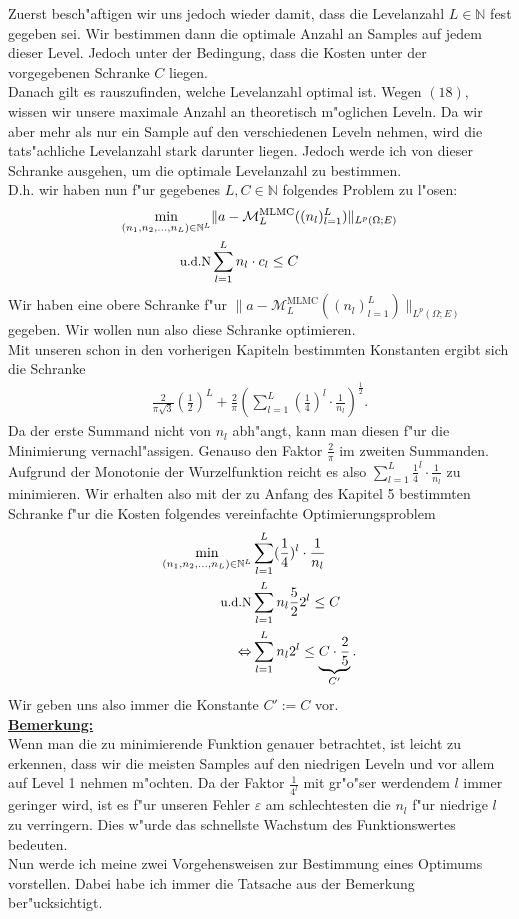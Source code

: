Zuerst besch"aftigen wir uns jedoch wieder damit, dass die Levelanzahl $L\in\mathbb{N}$ fest gegeben sei. Wir bestimmen dann die optimale Anzahl an Samples auf jedem dieser Level. Jedoch unter der Bedingung, dass die Kosten unter der vorgegebenen Schranke $C$ liegen.\\
Danach gilt es rauszufinden, welche Levelanzahl optimal ist. Wegen $(18)$, wissen wir unsere maximale Anzahl an theoretisch m"oglichen Leveln. Da wir aber mehr als nur ein Sample auf den verschiedenen Leveln nehmen, wird die tats"achliche Levelanzahl stark darunter liegen. Jedoch werde ich von dieser Schranke ausgehen, um die optimale Levelanzahl zu bestimmen.\\[0,1cm]
D.h. wir haben nun f"ur gegebenes $L,C \in \mathbb{N}$ folgendes Problem zu l"osen:
\begin{align*}
\min_{(n_1,n_2,...,n_L)\in\mathbb{N}^L}& \|a-\mathcal{M}_L^{\text{MLMC}}((n_l)_{l=1}^L)\|_{L^p(\Omega;E)}\\
\text{\small{u.d.N}}& \sum_{l=1}^L n_l \cdot c_l \leq C
\end{align*}
Wir haben eine obere Schranke f"ur $\|a-\mathcal{M}_L^{\text{MLMC}}((n_l)_{l=1}^L)\|_{L^p(\Omega;E)}$ gegeben. 
Wir wollen nun also diese Schranke optimieren.\\
 Mit unseren schon in den vorherigen Kapiteln bestimmten Konstanten ergibt sich die Schranke
\begin{align*}
\frac{2}{\pi\sqrt{3}}\left(\frac{1}{2}\right)^L+\frac{2}{\pi}\left(\sum_{l=1}^L\left(\frac{1}{4}\right)^l\cdot\frac{1}{n_l}\right)^{\frac{1}{2}}.
\end{align*}
Da der erste Summand nicht von $n_l$ abh"angt, kann man diesen f"ur die Minimierung vernachl"assigen. Genauso den Faktor $\frac{2}{\pi}$ im zweiten Summanden. Aufgrund der Monotonie der Wurzelfunktion reicht es also $\sum_{l=1}^L\frac{1}{4}^l\cdot\frac{1}{n_l}$ zu minimieren. Wir erhalten also mit der zu Anfang des Kapitel 5 bestimmten Schranke f"ur die Kosten folgendes vereinfachte Optimierungsproblem
\begin{align*}
\min_{(n_1,n_2,...,n_L)\in\mathbb{N}^L}&\sum_{l=1}^L(\frac{1}{4})^l\cdot\frac{1}{n_l}\\
\text{\small{u.d.N}}& \sum_{l=1}^L n_l \frac{5}{2}2^l\leq C\\
\Leftrightarrow& \sum_{l=1}^L n_l 2^l\leq \underbrace{C \cdot \frac{2}{5}}_{C'}.
\end{align*}
Wir geben uns also immer die Konstante $C':=C$ vor.\\[0,2cm]

\textbf{\underline{Bemerkung:}}\\
Wenn man die zu minimierende Funktion genauer betrachtet, ist leicht zu erkennen, dass wir die meisten Samples auf den niedrigen Leveln und vor allem auf Level 1 nehmen m"ochten. Da der Faktor $\frac{1}{4^l}$ mit gr"o"ser werdendem $l$ immer geringer wird, ist es f"ur unseren Fehler $\varepsilon$ am schlechtesten die $n_l$ f"ur niedrige $l$ zu verringern. Dies w"urde das schnellste Wachstum des Funktionswertes  bedeuten.\\[0,2cm]
Nun werde ich meine zwei Vorgehensweisen zur Bestimmung eines Optimums vorstellen. Dabei habe ich immer die Tatsache aus der Bemerkung ber"ucksichtigt.


